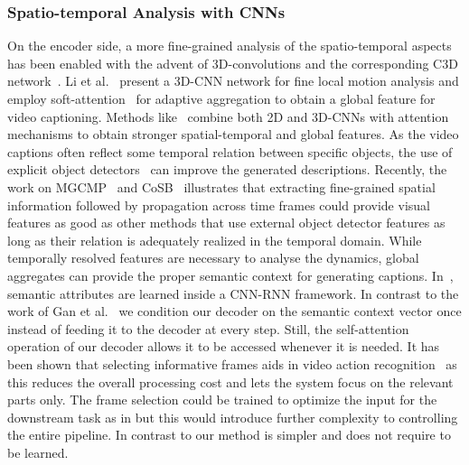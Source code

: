 \documentclass[runningheads,table]{llncs}
\begin{document}
\subsubsection{Spatio-temporal Analysis with CNNs}
On the encoder side, a more fine-grained analysis of the spatio-temporal aspects has been enabled with the advent of 3D-convolutions and the corresponding C3D network~\cite{tran2015learning}.
Li et al.~\cite{yao2015describing} present a 3D-CNN network for fine local motion analysis and employ soft-attention~\cite{bahdanau2014neural} for adaptive aggregation to obtain a global feature for video captioning. 
Methods like~\cite{aafaq2019spatio,cherian2020spatio,wang2019vatex,singh2020nits} combine both 2D and 3D-CNNs with attention mechanisms to obtain stronger spatial-temporal and global features.
As the video captions often reflect some temporal relation between specific objects, the use of explicit object detectors~\cite{pan2020spatio,zhang2019object,zheng2020syntax,zhang2020object} can improve the generated descriptions. 
Recently, the work on MGCMP~\cite{chen2021motion} and CoSB~\cite{vaidya2022co} illustrates that extracting fine-grained spatial information followed by propagation across time frames could provide visual features as good as other methods that use external object detector features as long as their relation is adequately realized in the temporal domain. 
While temporally resolved features are necessary to analyse the dynamics, 
global aggregates can provide the proper semantic context for generating captions.
In~\cite{shekhar2020domain,perez2021improving,chen2020semantics}, semantic attributes are learned inside a CNN-RNN framework. 
In contrast to the work of Gan et al.~\cite{gan2017semantic} 
we condition our decoder on the semantic context vector once instead of feeding it to the decoder at every step.
Still, the self-attention operation of our decoder allows it to be accessed whenever it is needed.
It has been shown that selecting informative frames aids in video action recognition~\cite{gowda2020smart} as this reduces the overall processing cost and lets the system focus on the relevant parts only. The frame selection could be trained to optimize the input for the downstream task as in \cite{chen2018less,gowda2020smart} but this would introduce further complexity to controlling the entire pipeline.
In contrast to \cite{chen2018less,gowda2020smart} our method is simpler and does not require to be learned.
\end{document}
